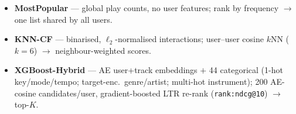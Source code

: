 \documentclass[a1paper, 14pt]{extarticle}
\newcommand{\fcap}[1]{{\LARGE\itshape #1}}
\begin{document}
\begin{minipage}[t]{0.48\textwidth}
  \begin{tcolorbox}[posterbox, title=Baselines]
    \begin{itemize}
    \item \textbf{MostPopular} — global play counts, no user features; rank by frequency $\to$ one list shared by all users.
    \item \textbf{KNN-CF} — binarised, $\ell_2$-normalised interactions; user–user cosine $k$NN ($k{=}6$) $\to$ neighbour-weighted scores.
    \item \textbf{XGBoost-Hybrid} — AE user+track embeddings $+$ 44 categorical (1-hot key/mode/tempo; target-enc.\ genre/artist; multi-hot instrument); 200 AE-cosine candidates/user, gradient-boosted LTR re-rank (\texttt{rank:ndcg@10}) $\to$ top-$K$.
    \end{itemize}
  \end{tcolorbox}

\end{minipage}%
\hfill
\end{document}
